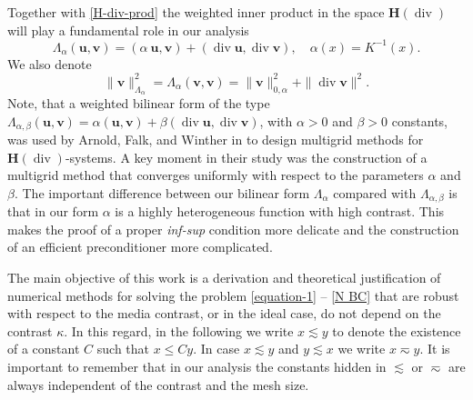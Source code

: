 \documentclass[11pt]{amsart}
\numberwithin{equation}{section}
\theoremstyle{definition}\newtheorem{example}{Example}[section]
\begin{document}
Together with \eqref{H-div-prod} the weighted inner product in the space ${{\boldsymbol H}}({\operatorname{div}})$ 
will play a fundamental role in our analysis  
\begin{equation}\label{WH-div-prod}
\Lambda_{{\alpha}}({{\mathbf u}}, {{\mathbf v}})= ({{\alpha}}~{{\mathbf u}},{{\mathbf v}}) + ({\operatorname{div}} {{\mathbf u}}, {\operatorname{div}} {{\mathbf v}}), 
\quad \alpha(x) = K^{-1}(x).
\end{equation}
We also denote
\[
\|{{\mathbf v}}\|^2_{\Lambda_\alpha}  = 
\Lambda_{{\alpha}}({{\mathbf v}}, {{\mathbf v}})= 
\|{{\mathbf v}}\|^2_{0,\alpha} + \|{\operatorname{div}} {{\mathbf v}}\|^2.
\]
Note, that a weighted bilinear form of the type $
\Lambda_{\alpha,\beta}({{\mathbf u}}, {{\mathbf v}})= \alpha ({{\mathbf u}}, {{\mathbf v}}) + \beta ({\operatorname{div}}
{{\mathbf u}}, {\operatorname{div}} {{\mathbf v}}) $, with $\alpha > 0$ and $\beta > 0$ constants, was
used by Arnold, Falk, and Winther in \cite{Arnold2000MG} to design
multigrid methods for ${{\boldsymbol H}}({\operatorname{div}})$-systems.  A key moment in their
study was the construction of a multigrid method that converges
uniformly with respect to the parameters $\alpha$ and $\beta$. The
important difference between our bilinear form $\Lambda_\alpha$
compared with $ \Lambda_{\alpha,\beta}$ is that in our form $\alpha$
is a highly heterogeneous function with high contrast.
This makes the proof of a proper {\it inf-sup} condition more delicate
and the construction of an efficient preconditioner more complicated.

The main objective of this work is a derivation and theoretical justification
of numerical methods for solving the problem \eqref{equation-1} --
\eqref{N BC} 
that are robust with respect to the media contrast, or in the ideal case, 
do not depend on the contrast
$\kappa$. In this regard, in the following we write $x \lesssim y$ to
denote the existence of a constant $C$ such that $x\le Cy$. In case
$x\lesssim y$ and $y\lesssim x$ we write $x\eqsim y$. It is important
to remember that in our analysis the constants hidden in $\lesssim$ or
$\eqsim$ are always independent of the contrast and the mesh size.
\end{document}
